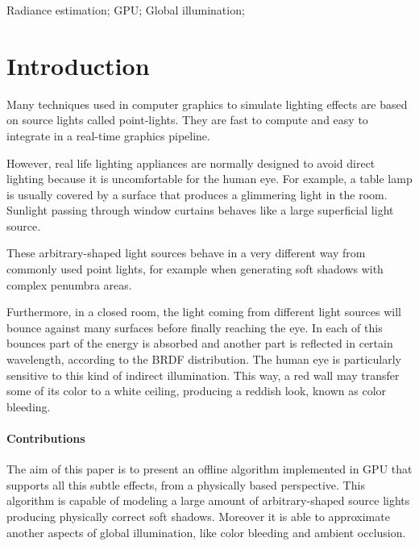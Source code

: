 \documentclass[10pt, conference]{IEEEtran}
\begin{document}
\begin{IEEEkeywords}
Radiance estimation; GPU; Global illumination;
\end{IEEEkeywords}


\IEEEpeerreviewmaketitle





\section{Introduction}
%
Many techniques used in computer graphics to simulate lighting effects are based on source lights called point-lights. 
They are fast to compute and easy to integrate in a real-time graphics pipeline.\

However, real life lighting appliances are normally designed to avoid direct lighting because it is uncomfortable for the human eye. 
For example, a table lamp is usually covered by a surface that produces a glimmering light in the room. 
Sunlight passing through window curtains behaves like a large superficial light source.\

These arbitrary-shaped light sources behave in a very different way from commonly used point lights, 
for example when generating soft shadows with complex penumbra areas.\

Furthermore, in a closed room, the light coming from different light sources will bounce against many surfaces before finally reaching the eye. 
In each of this bounces part of the energy is absorbed and another part is reflected in certain wavelength, 
according to the BRDF \cite{brdf} distribution. The human eye is particularly sensitive to this kind of indirect illumination. 
This way, a red wall may transfer some of its color to a white ceiling, producing a reddish look, known as color bleeding.\


\paragraph*{Contributions}
%
The aim of this paper is to present an offline algorithm implemented in GPU that supports all this subtle effects, 
from a physically based perspective. This algorithm is capable of modeling a large amount of arbitrary-shaped source lights producing physically correct soft shadows. Moreover it is able to approximate another aspects of global illumination, 
like color bleeding and ambient occlusion. 
\end{document}
